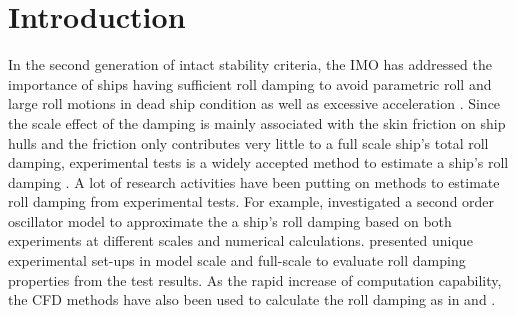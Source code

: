 \section{Introduction}
\label{se:introduction}

In the second generation of intact stability criteria, the IMO has addressed the importance of ships having sufficient roll damping to avoid parametric roll and large roll motions in dead ship condition as well as excessive acceleration \parencite{imo_finalization_2016}. 
Since the scale effect of the damping is mainly associated with the skin friction on ship hulls and the friction only contributes very little to a full scale ship's total roll damping, experimental tests is a widely accepted method to estimate a ship's roll damping \parencite{imo_1200_2006}. A lot of research activities have been putting on methods to estimate roll damping from experimental tests. For example, \parencite[]{hua_approximation_2011} investigated a second order oscillator model to approximate the a ship's roll damping based on both experiments at different scales and numerical calculations. \parencite{soder_ikeda_2019} presented unique experimental set-ups in model scale and full-scale to evaluate roll damping properties from the test results. 
As the rapid increase of computation capability, the CFD methods have also been used to calculate the roll damping as in \parencite{kristiansen_experimental_2014} and \parencite{henry_peter_piehl_ship_2016}.  

